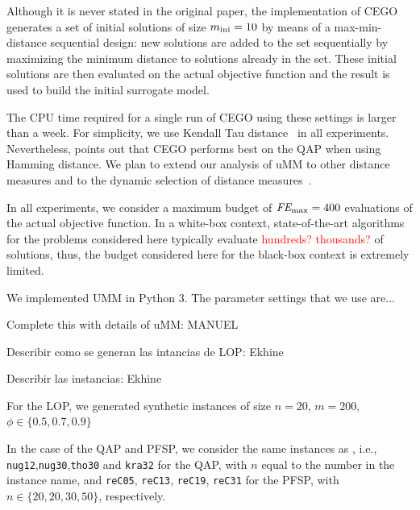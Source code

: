 \documentclass[runningheads]{llncs}
\begin{document}
Although it is never stated in the original paper, the implementation of CEGO
generates a set of initial solutions of size $m_\text{ini}=10$ by means of a
max-min-distance sequential design: new solutions are added to the set
sequentially by maximizing the minimum distance to solutions already in the
set. These initial solutions are then evaluated on the actual objective
function and the result is used to build the initial surrogate
model.%

The CPU time required for a single run of CEGO using these settings is larger
than a week.  For simplicity, we use Kendall Tau distance~\citep{?} in all
experiments. Nevertheless,
\citet{ZaeStoFriFisNauBar2014} points out that CEGO performs best on the QAP
when using Hamming distance. We plan to extend our analysis of uMM to other
distance measures and to the dynamic selection of distance
measures~\citep{ZaeStoBar2014:ppsn}.

In all experiments, we consider a maximum budget of $\textit{FE}_{\max}=400$ evaluations of
the actual objective function. In a white-box context, state-of-the-art
algorithms for the problems considered here typically evaluate
\textcolor{red}{hundreds? thousands?} of solutions, thus, the budget considered
here for the black-box context is extremely limited.

We implemented UMM in Python 3. The parameter settings that we use are...

Complete this with details of uMM: MANUEL



Describir como se generan las intancias de LOP: Ekhine

Describir las instancias: Ekhine

For the LOP, we generated synthetic instances of size $n=20$, $m=200$, $\phi\in\{0.5,0.7,0.9\}$

In the case of the QAP and PFSP, we consider the same instances as
\citet{ZaeStoFriFisNauBar2014,ZaeStoBar2014:ppsn}, i.e.,
\texttt{nug12},\texttt{nug30},\texttt{tho30} and \texttt{kra32} for the QAP,
with $n$ equal to the number in the instance name, and \texttt{reC05},
\texttt{reC13}, \texttt{reC19}, \texttt{reC31} for the PFSP, with
$n \in \{20, 20, 30, 50\}$, respectively.
\end{document}
